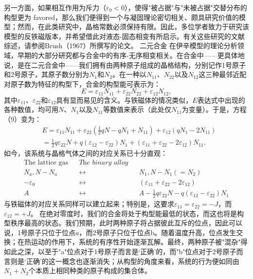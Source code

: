 另一方面，如果相互作用为斥力（\(\varepsilon_0 < 0\)），使得"被占据"与"未被占据"交替分布的构型更为 favored，那么我们便得到一个与凝固理论密切相关、颇具研究价值的模型；然而，在此类研究中，晶格常数必须保持有限。因此，多位学者致力于研究该模型的反铁磁版本，并希望借此对液态-固态相变有所启示。有关这些研究的文献综述，请参阅Brush（1967）所撰写的论文。
二元合金
在伊辛模型的理论分析领域，早期的大部分研究都与合金中的有序-无序相变相关。在合金中——更具体地说，是在二元合金中——我们拥有由两种原子组成的晶格结构，分别记作1号原子和2号原子，其原子数分别为\(N_{1}\)和\(N_{2}\)。在一种以\(N_{11}\)、\(N_{22}\)以及\(N_{12}\)这三种最邻近配对原子数为特征的构型下，合金的构型能可表示为：
\begin{equation}\tag{12.4.10}\label{eq:12.4.10}
E = \varepsilon _ { 11 } N _ { 11 } + \varepsilon _ { 22 } N _ { 22 } + \varepsilon _ { 12 } N _ { 12 } ,
\end{equation}
其中\(\varepsilon_{11}\)、\(\varepsilon_{22}\)和\(\varepsilon_{12}\)具有显而易见的含义。与铁磁体的情况类似，\(E\)表达式中出现的各种数值，均可用\(N\)、\(N_{1}\)以及\(N_{11}\)等数值来表示（此处仅\(N_{11}\)为变量）。于是，方程（9）变为：
\begin{equation}\tag{12.4.11}\label{eq:12.4.11}
\begin{array}{rl} & { E = \varepsilon _ { 11 } N _ { 11 } + \varepsilon _ { 22 } \left( \frac { 1 } { 2 } q N - q N _ { 1 } + N _ { 11 } \right) + \varepsilon _ { 12 } \left( q N _ { 1 } - 2 N _ { 11 } \right) } \\& {  = \frac { 1 } { 2 } q \varepsilon _ { 22 } N + q ( \varepsilon _ { 12 } - \varepsilon _ { 22 } ) N _ { 1 } + ( \varepsilon _ { 11 } + \varepsilon _ { 22 } - 2 \varepsilon _ { 12 } ) N _ { 11 } . } \end{array}
\end{equation}
如今，该系统与晶格气体之间的对应关系已十分直观：
\begin{equation}\tag{12.4.12}\label{eq:12.4.12}
\begin{aligned}\text{The lattice gas}&&\textit{The binary alloy}\\N_{a},N-N_{a}&&\leftrightarrow&&N_{1},N-N_{1}(=N_{2})\\-\varepsilon_{0}&&\leftrightarrow&&(\varepsilon_{11}+\varepsilon_{22}-2\varepsilon_{12})\\A&&\leftrightarrow&&A-\frac{1}{2}q\varepsilon_{22}N-q(\varepsilon_{12}-\varepsilon_{22})N_{1}\end{aligned}
\end{equation}
与铁磁体的对应关系同样可以建立起来；特别是，这要求\(\varepsilon_{11} = \varepsilon_{22} = -J\)，而\(\varepsilon_{12} = +J\)。
在绝对零度时，我们的合金将处于构型能最低的状态，而这也将是构型秩序最高的状态。我们预期，此时两种原子将占据彼此互斥的位点，因此可以说，1号原子只位于位点\(a，而2号原子只位于位点\)b。随着温度升高，位点发生交换；在热运动的作用下，系统的有序性开始逐渐瓦解。最终，两种原子被"混杂"得如此之深，以至于"a"位点对于1号原子而言是`正确'的，而"b"位点对于2号原子而言则是`正确'的这一概念也逐渐消失；从构型的角度来看，系统的行为便如同由\(N_1 + N_2\)个本质上相同种类的原子构成的集合体。
